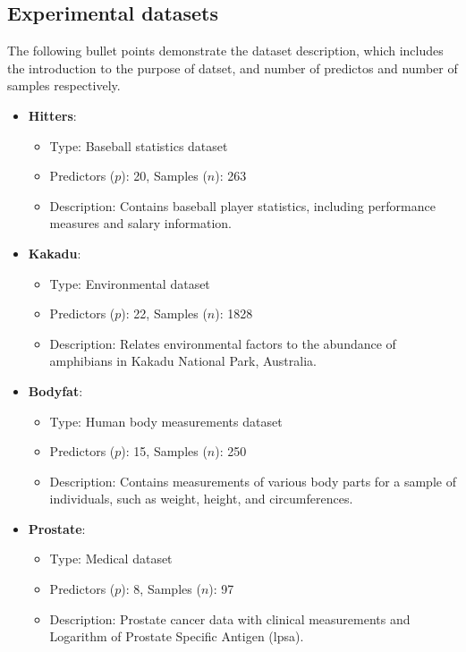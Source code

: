 \subsection{Experimental datasets}
The following bullet points demonstrate the dataset description, which includes the introduction to the purpose of datset, and number of predictos and number of samples respectively.
\begin{itemize}
	
	\item \textbf{Hitters}:
	\begin{itemize}
		\item Type: Baseball statistics dataset
		\item Predictors ($p$): 20, Samples ($n$): 263
		\item Description: Contains baseball player statistics, including performance measures and salary information.
	\end{itemize}
	
	\item \textbf{Kakadu}:
	\begin{itemize}
		\item Type: Environmental dataset
		\item Predictors ($p$): 22, Samples ($n$): 1828
		\item Description: Relates environmental factors to the abundance of amphibians in Kakadu National Park, Australia.
	\end{itemize}
	
	\item \textbf{Bodyfat}:
	\begin{itemize}
		\item Type: Human body measurements dataset
		\item Predictors ($p$): 15, Samples ($n$): 250
		\item Description: Contains measurements of various body parts for a sample of individuals, such as weight, height, and circumferences.
	\end{itemize}
	\item \textbf{Prostate}:
	\begin{itemize}
		\item Type: Medical dataset
		\item Predictors ($p$): 8, Samples ($n$): 97
		\item Description: Prostate cancer data with clinical measurements and Logarithm of Prostate Specific Antigen (lpsa).
	\end{itemize}
	

\end{itemize}
